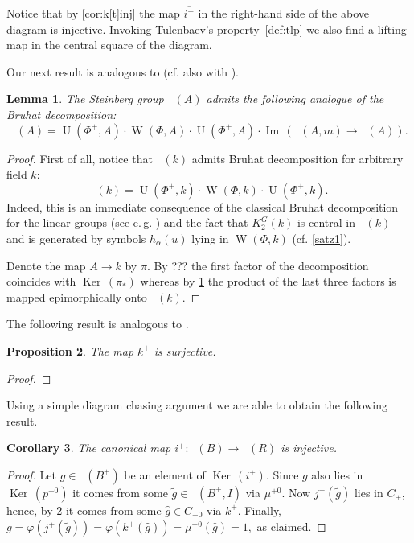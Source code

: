 \documentclass[oneside,12pt]{amsart}
\numberwithin{equation}{section}
\newtheorem{lem}{Lemma}
\numberwithin{lem}{section}
\newtheorem{cor}[lem]{Corollary}
\newtheorem{prop}[lem]{Proposition}
\theoremstyle{definition}
\theoremstyle{remark}
\DeclareMathOperator{\UU}{U}
\DeclareMathOperator{\St}{St^G}
\DeclareMathOperator{\WW}{W}
\DeclareMathOperator{\Bigker}{Ker\,}
\DeclareMathOperator{\im}{Im\,}
\begin{document}
Notice that by \cref{cor:k[t]inj} the map $\overline{i^+}$ in the right-hand side of the above diagram is injective.
Invoking Tulenbaev's property~\ref{def:tlp} we also find a lifting map in the central square of the diagram.

Our next result is analogous to \cite[Lemma~3.1(e)]{Tu} (cf. also with \cite[\S~2.3A]{HOM}).
\begin{lem} \label{cor:bruhat} The Steinberg group $\St(A)$ admits the following analogue of the Bruhat decomposition:
$$\St(A) = \UU(\Phi^+, A) \cdot \WW(\Phi, A) \cdot \UU(\Phi^+, A) \cdot \im(\St(A, m) \rightarrow \St(A)).$$ \end{lem}
\begin{proof}
 First of all, notice that $\St(k)$ admits Bruhat decomposition for arbitrary field $k$:
 $$\St(k) = \UU(\Phi^+, k) \cdot \WW(\Phi, k) \cdot \UU(\Phi^+, k).$$
 Indeed, this is an immediate consequence of the classical Bruhat decomposition for the linear groups (see e.\,g. \cite[Theorem~4]{St-lect}) and the fact
 that $K_2^G(k)$ is central in $\St(k)$ and is generated by symbols $h_\alpha(u)$ lying in $\WW(\Phi, k)$ (cf. \cref{satz1}).
 
 Denote the map $A \rightarrow k$ by $\pi$.
 By ??? the first factor of the decomposition coincides with $\Bigker(\pi_*)$ whereas by \cref{cor:bruhat} the product of the last three factors is mapped epimorphically onto $\St(k)$.
\end{proof}

The following result is analogous to \cite[Proposition~4.1]{Tu}.
\begin{prop} \label{prop:kersurj} The map $k^+$ is surjective. \end{prop}
\begin{proof}
\end{proof}

Using a simple diagram chasing argument we are able to obtain the following result.
\begin{cor} \label{cor:tulinj} The canonical map $i^+ \colon \St(B) \rightarrow \St(R)$ is injective. \end{cor}
\begin{proof}
 Let $g \in \St(B^+)$ be an element of $\Bigker(i^+)$.
 Since $g$ also lies in $\Bigker(p^{+0})$ it comes from some $\widetilde{g} \in \St(B^+, I)$ via $\mu^{+0}$.
 Now $j^+(\widetilde{g})$ lies in $C_\pm$, hence, by \cref{prop:kersurj} it comes from some $\widehat{g} \in C_{+0}$ via $k^+$.
 Finally, $g = \varphi(j^+(\widetilde{g})) = \varphi(k^+(\widehat{g})) = \mu^{+0}(\widehat{g}) = 1,$ as claimed.
\end{proof}
\end{document}
